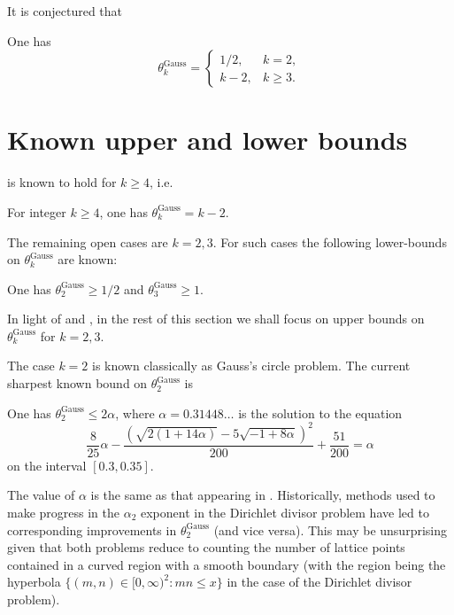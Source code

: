 It is conjectured that 

\begin{conjecture}\label{gauss-circle-conj}
One has 
\[
\theta^{\operatorname{Gauss}}_{k} = \begin{cases}
1/2,& k = 2,\\
k - 2,& k \ge 3.
\end{cases}
\]
\end{conjecture}


\section{Known upper and lower bounds}

 is known to hold for $k \ge 4$, i.e.

\begin{theorem}
For integer $k \ge 4$, one has $\theta^{\operatorname{Gauss}}_{k} = k - 2$.
\end{theorem}

The remaining open cases are $k = 2, 3$. For such cases the following lower-bounds on $\theta^{\operatorname{Gauss}}_{k}$ are known:

\begin{theorem}\label{gauss-circle-lower-23}
One has $\theta^{\operatorname{Gauss}}_{2} \ge 1/2$ and $\theta^{\operatorname{Gauss}}_{3} \ge 1$.
\end{theorem}

In light of  and , in the rest of this section we shall focus on upper bounds on $\theta^{\operatorname{Gauss}}_{k}$ for $k = 2, 3$.

The case $k = 2$ is known classically as Gauss's circle problem. The current sharpest known bound on $\theta_2^{\operatorname{Gauss}}$ is
\begin{theorem} 
One has $\theta_2^{\operatorname{Gauss}} \le 2\alpha$, where $\alpha = 0.31448\ldots$ is the solution to the equation
\[
\frac{8}{25}\alpha - \frac{(\sqrt{2(1+14\alpha)} - 5\sqrt{-1+8\alpha})^2}{200} + \frac{51}{200} = \alpha
\]
on the interval $[0.3, 0.35]$.
\end{theorem}

\begin{remark}
The value of $\alpha$ is the same as that appearing in . Historically, methods used to make progress in the $\alpha_2$ exponent in the Dirichlet divisor problem have led to corresponding improvements in $\theta_2^{\operatorname{Gauss}}$ (and vice versa). This may be unsurprising given that both problems reduce to counting the number of lattice points contained in a curved region with a smooth boundary (with the region being the hyperbola $\{(m,n) \in [0, \infty)^2: mn \le x \}$ in the case of the Dirichlet divisor problem).
\end{remark}


